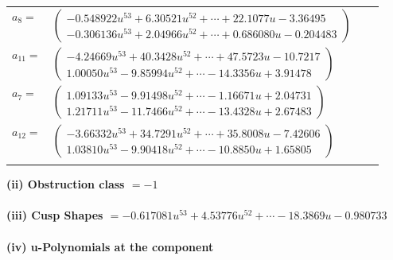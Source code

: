 \documentclass[1p]{elsarticle_modified}
\theoremstyle{definition}
\begin{document}
\begin{tabular}{m{7pt} m{180pt} m{7pt} m{180pt} }
\flushright $a_{8}=$&$\begin{pmatrix}-0.548922 u^{53}+6.30521 u^{52}+\cdots+22.1077 u-3.36495\\-0.306136 u^{53}+2.04966 u^{52}+\cdots+0.686080 u-0.204483\end{pmatrix}$ \\
\flushright $a_{11}=$&$\begin{pmatrix}-4.24669 u^{53}+40.3428 u^{52}+\cdots+47.5723 u-10.7217\\1.00050 u^{53}-9.85994 u^{52}+\cdots-14.3356 u+3.91478\end{pmatrix}$ \\
\flushright $a_{7}=$&$\begin{pmatrix}1.09133 u^{53}-9.91498 u^{52}+\cdots-1.16671 u+2.04731\\1.21711 u^{53}-11.7466 u^{52}+\cdots-13.4328 u+2.67483\end{pmatrix}$ \\
\flushright $a_{12}=$&$\begin{pmatrix}-3.66332 u^{53}+34.7291 u^{52}+\cdots+35.8008 u-7.42606\\1.03810 u^{53}-9.90418 u^{52}+\cdots-10.8850 u+1.65805\end{pmatrix}$\\&\end{tabular}
\flushleft \textbf{(ii) Obstruction class $= -1$}\\~\\
\flushleft \textbf{(iii) Cusp Shapes $= -0.617081 u^{53}+4.53776 u^{52}+\cdots-18.3869 u-0.980733$}\\~\\
\newpage\renewcommand{\arraystretch}{1}
\flushleft \textbf{(iv) u-Polynomials at the component}\newline \\
\end{document}
